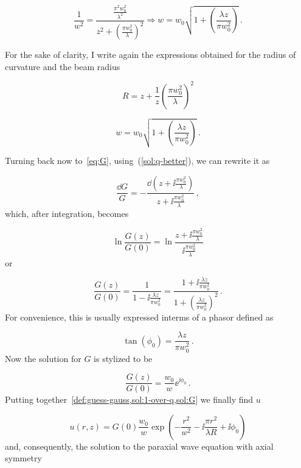 \documentclass[12pt, class=report, crop=false]{standalone}
\begin{document}
\begin{equation*}
  \frac{1}{w^2} = \frac{\frac{\pi^2 w_0^2}{\lambda^2}}{z^2 + \left(\frac{\pi w_0^2}{\lambda} \right)^2} \Rightarrow w = w_0 \sqrt{1+ \left(\frac{\lambda z}{\pi w_0^2}\right)}\,.
\end{equation*}

For the sake of clarity, I write again the expressions obtained for the radius of curvature and the beam radius

\begin{equation}
  R = z + \frac{1}{z} \left(\frac{\pi w_0^2}{\lambda} \right)^2
\end{equation}

\begin{equation}
  w = w_0 \sqrt{1+ \left(\frac{\lambda z}{\pi w_0^2}\right)}\,.
\end{equation}

Turning back now to~\cref{eq:G}, using~(\ref{sol:q-better}), we can rewrite it as

\begin{equation*}
  \frac{\dd{G}}{G} = - \frac{\dd(z+\ii \frac{\pi w_0^2}{\lambda})}{z + \ii \frac{\pi w_0^2}{\lambda}}\,,
\end{equation*}
which, after integration, becomes

\begin{equation*}
  \ln{\frac{G(z)}{G(0)}} = \ln{\frac{z+\ii \frac{\pi w_0^2}{\lambda}}{\ii \frac{\pi w_0^2}{\lambda}}}
\end{equation*}
or

\begin{equation}
  \frac{G(z)}{G(0)} = \frac{1}{1 - \ii \frac{\lambda z}{\pi w_0^2}} = \frac{1 + \ii \frac{\lambda z}{\pi w_0^2}}{1 +\left(\frac{\lambda z}{\pi w_0^2}\right)^2}\,.
\end{equation}
For convenience, this is usually expressed interms of a phasor defined as

\begin{equation}
  \tan(\phi_0) = \frac{\lambda z}{\pi w_0^2}\,.
\end{equation}
Now the solution for \(G\) is stylized to be

\begin{equation}
  \label{sol:G}
  \frac{G(z)}{G(0)} = \frac{w_0}{w} \ee^{\ii \phi_0}\,.
\end{equation}
Putting together~\cref{def:guess-gauss,sol:1-over-q,sol:G} we finally find \(u\)

\begin{equation}
  u(r,z) = G(0) \frac{w_0}{w} \exp(-\frac{r^2}{w^2} - \ii \frac{\pi r^2}{\lambda R} + \ii \phi_0)
\end{equation}
and, consequently, the solution to the paraxial wave equation with axial symmetry
\end{document}
